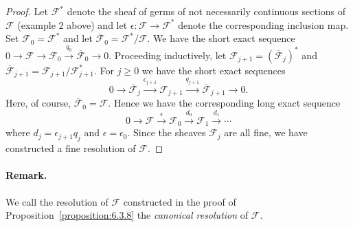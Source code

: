 \begin{proof}
Let $\mathcal F^*$ denote the sheaf of germs of not necessarily continuous sections of $\mathcal F$ (example 2 above) and let $\epsilon:\mathcal F\to\mathcal F^*$ denote the corresponding inclusion map. Set $\mathcal F_0=\mathcal F^*$ and let $\overline{\mathcal F}_0=\mathcal F^*/\mathcal F$. We have the short exact sequence $0\to\mathcal F\to\mathcal F_0\xrightarrow{q_0}\overline{\mathcal F}_0\to0$. Proceeding inductively, let $\mathcal F_{j+1}=(\overline{\mathcal F}_j)^*$ and $\overline{\mathcal F}_{j+1}=\mathcal F_{j+1}/\mathcal F^*_{j+1}$. For $j\geq0$ we have the short exact sequences
\[
0\to\overline{\mathcal F}_j\xrightarrow{\epsilon_{j+1}}\mathcal F_{j+1}\xrightarrow{q_{j+1}}\overline{\mathcal F}_{j+1}\to0.
\]
Here, of course, $\overline{\mathcal F}_0=\mathcal F$. Hence we have the corresponding long exact sequence
\[
0\to\mathcal F\xrightarrow\epsilon\mathcal F_0\xrightarrow{d_0}\mathcal F_1\xrightarrow{d_1}\cdots
\]
where $d_j=\epsilon_{j+1}q_j$ and $\epsilon=\epsilon_0$. Since the sheaves $\mathcal F_j$ are all fine, we have constructed a fine resolution of $\mathcal F$.
\end{proof}
\paragraph{Remark.} We call the resolution of $\mathcal F$ constructed in the proof of Proposition~\ref{proposition:6.3.8} the \emph{canonical resolution} of $\mathcal F$.

